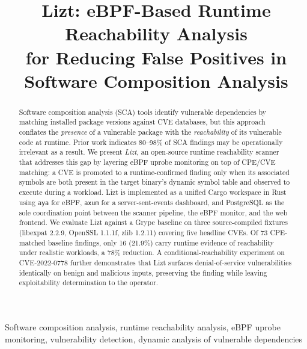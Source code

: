 \documentclass[conference]{IEEEtran}
\begin{document}

\title{Lizt: eBPF-Based Runtime Reachability Analysis\\
for Reducing False Positives in Software Composition Analysis}

\author{%
}

\maketitle

\begin{abstract}
Software composition analysis (SCA) tools identify vulnerable dependencies by matching installed package versions against CVE databases, but this approach conflates the \emph{presence} of a vulnerable package with the \emph{reachability} of its vulnerable code at runtime.
Prior work indicates 80--98\% of SCA findings may be operationally irrelevant as a result.
We present \textit{Lizt}, an open-source runtime reachability scanner that addresses this gap by layering eBPF uprobe monitoring on top of CPE/CVE matching: a CVE is promoted to a runtime-confirmed finding only when its associated symbols are both present in the target binary's dynamic symbol table and observed to execute during a workload.
Lizt is implemented as a unified Cargo workspace in Rust using \texttt{aya} for eBPF, \texttt{axum} for a server-sent-events dashboard, and PostgreSQL as the sole coordination point between the scanner pipeline, the eBPF monitor, and the web frontend.
We evaluate Lizt against a Grype baseline on three source-compiled fixtures (libexpat 2.2.9, OpenSSL 1.1.1f, zlib 1.2.11) covering five headline CVEs.
Of 73 CPE-matched baseline findings, only 16 (21.9\%) carry runtime evidence of reachability under realistic workloads, a 78\% reduction.
A conditional-reachability experiment on CVE-2022-0778 further demonstrates that Lizt surfaces denial-of-service vulnerabilities identically on benign and malicious inputs, preserving the finding while leaving exploitability determination to the operator.
\end{abstract}


\begin{IEEEkeywords}
Software composition analysis, runtime reachability analysis,
eBPF uprobe monitoring, vulnerability detection,
dynamic analysis of vulnerable dependencies
\end{IEEEkeywords}
\end{document}
